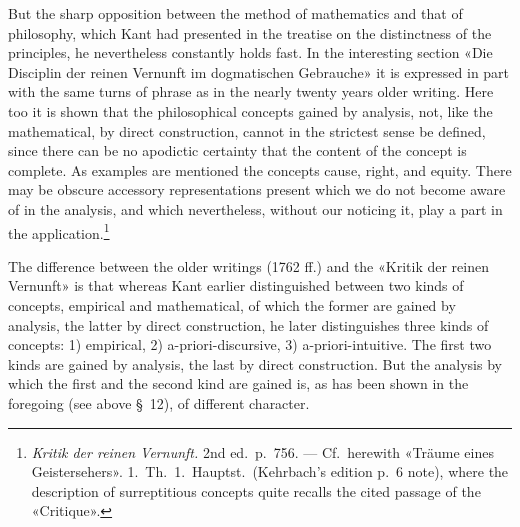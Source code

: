 \documentclass[12pt,a4paper]{article}
\newcommand{\opage}[1]{\marginnote{\footnotesize\textit{[#1]}}}
\begin{document}
But the sharp opposition between the method of mathematics and that of
philosophy, which \opage{29}Kant had presented in the treatise on the distinctness of
the principles, he nevertheless constantly holds fast. In the interesting
section «Die Disciplin der reinen Vernunft im dogmatischen Gebrauche» it is
expressed in part with the same turns of phrase as in the nearly twenty
years older writing. Here too it is shown that the philosophical concepts
gained by analysis, not, like the mathematical, by direct construction,
cannot in the strictest sense be defined, since there can be no apodictic
certainty that the content of the concept is complete. As examples are
mentioned the concepts cause, right, and equity. There may be obscure
accessory representations present which we do not become aware of in the
analysis, and which nevertheless, without our noticing it, play a part in
the application.\footnote{\textit{Kritik der reinen Vernunft.} 2nd ed.\
p.\ 756. --- Cf.\ herewith «Träume eines Geistersehers». 1.\ Th.\ 1.\
Hauptst.\ (Kehrbach's edition p.\ 6 note), where the description of
surreptitious concepts quite recalls the cited passage of the «Critique».}

The difference between the older writings (1762 ff.) and the «Kritik der
reinen Vernunft» is that whereas Kant earlier distinguished between two
kinds of concepts, empirical and mathematical, of which the former are
gained by analysis, the latter by direct construction, he later
distinguishes three kinds of concepts: 1) empirical, 2)
a-priori-discursive, 3) a-priori-intuitive. The first two kinds are gained
by analysis, the last by direct construction. But the analysis by which the
first and the second kind are gained is, as has been shown in the foregoing
(see above §\ 12), of different character.
\end{document}
